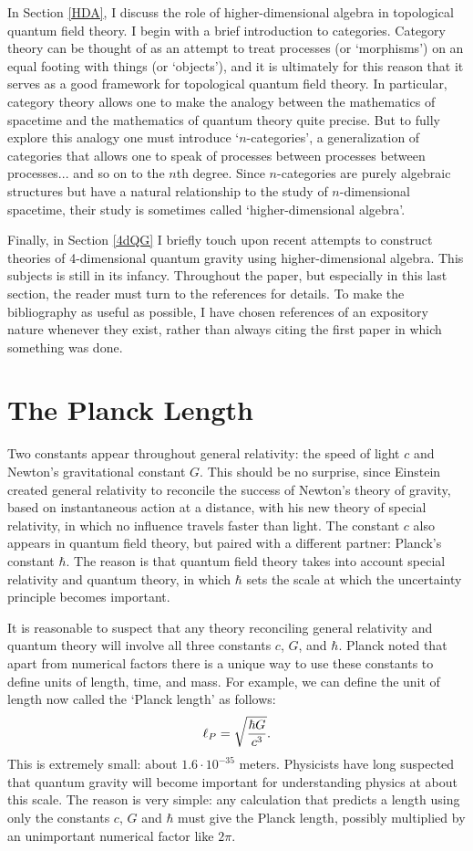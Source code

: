 In Section \ref{HDA}, I discuss the role of higher-dimensional algebra
in topological quantum field theory.  I begin with a brief
introduction to categories.  Category theory can be thought of as
an attempt to treat processes (or `morphisms') on an equal footing with
things (or `objects'), and it is ultimately for this reason that it
serves as a good framework for topological quantum field theory.  In
particular, category theory allows one to make the analogy between the
mathematics of spacetime and the mathematics of quantum theory quite
precise.  But to fully explore this analogy one must introduce
`$n$-categories', a generalization of categories that allows one to
speak of processes between processes between processes... and so on to
the $n$th degree.  Since $n$-categories are purely algebraic structures
but have a natural relationship to the study of $n$-dimensional
spacetime, their study is sometimes called `higher-dimensional algebra'.
 
Finally, in Section \ref{4dQG} I briefly touch upon recent attempts to
construct theories of 4-dimensional quantum gravity using 
higher-dimensional algebra.  This subjects is still in its infancy.
Throughout the paper, but especially  in this last section, the reader
must turn to the references for details.  To make the bibliography as
useful as possible, I have chosen references of an expository nature 
whenever they exist, rather than always citing the first paper in which 
something was done.  

\section{The Planck Length} \label{planck.length}

Two constants appear throughout general relativity: the speed of light
$c$ and Newton's gravitational constant $G$.   This should be no
surprise, since Einstein created general relativity to reconcile the
success of Newton's theory of gravity, based on instantaneous action at
a distance, with his new theory of special relativity, in which no
influence travels faster than light.  The constant $c$ also appears in
quantum field theory, but paired with a different partner: Planck's
constant $\hbar$.   The reason is that quantum field theory takes
into account special relativity and quantum theory, in which $\hbar$ 
sets the scale at which the uncertainty principle becomes important.  

It is reasonable to suspect that any theory reconciling general
relativity and quantum theory will involve all three constants $c$, $G$,
and $\hbar$.  Planck noted that apart from numerical factors there
is a unique way to use these constants to define units of length, time, 
and mass.  For example, we can define the unit of length now
called the `Planck length' as follows:
\[          \ell_P = \sqrt{\hbar G \over c^3}.  \]
This is extremely small: about $1.6 \cdot 10^{-35}$ meters.   Physicists
have long suspected that quantum gravity will become important for
understanding physics at about this scale.   The reason is very simple: any
calculation that predicts a length using only the constants $c$, $G$ and
$\hbar$ must give the Planck length, possibly multiplied by an
unimportant numerical factor like $2\pi$.  


